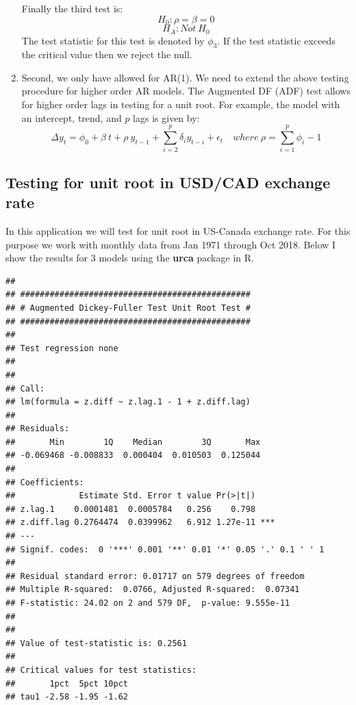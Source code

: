 \documentclass[]{book}
\theoremstyle{definition}
\theoremstyle{definition}
\theoremstyle{definition}
\theoremstyle{remark}
\begin{document}
\begin{enumerate}
  Finally the third test is:
  \[H_0: \rho=\beta=0 \]
  \[H_A: Not \ H_0\]
  The test statistic for this test is denoted by \(\phi_3\). If the test statistic exceeds the critical value then we reject the null.
\item
  Second, we only have allowed for AR(1). We need to extend the above testing procedure for higher order AR models. The Augmented DF (ADF) test allows for higher order lags in testing for a unit root. For example, the model with an intercept, trend, and \(p\) lags is given by:
  \[\Delta y_t= \phi_0 + \beta \ t+ \rho \ y_{t-1}+\sum_{i=2}^p\delta_i  y_{t-i}+\epsilon_t  \quad where \ \rho=\sum_{i=1}^p \phi_i-1\]
\end{enumerate}

\hypertarget{testing-for-unit-root-in-usdcad-exchange-rate}{%
\subsection{Testing for unit root in USD/CAD exchange rate}\label{testing-for-unit-root-in-usdcad-exchange-rate}}

In this application we will test for unit root in US-Canada exchange rate. For this purpose we work with monthly data from Jan 1971 through Oct 2018. Below I show the results for 3 models using the \textbf{urca} package in R.

\begin{verbatim}
## 
## ############################################### 
## # Augmented Dickey-Fuller Test Unit Root Test # 
## ############################################### 
## 
## Test regression none 
## 
## 
## Call:
## lm(formula = z.diff ~ z.lag.1 - 1 + z.diff.lag)
## 
## Residuals:
##       Min        1Q    Median        3Q       Max 
## -0.069468 -0.008833  0.000404  0.010503  0.125044 
## 
## Coefficients:
##             Estimate Std. Error t value Pr(>|t|)    
## z.lag.1    0.0001481  0.0005784   0.256    0.798    
## z.diff.lag 0.2764474  0.0399962   6.912 1.27e-11 ***
## ---
## Signif. codes:  0 '***' 0.001 '**' 0.01 '*' 0.05 '.' 0.1 ' ' 1
## 
## Residual standard error: 0.01717 on 579 degrees of freedom
## Multiple R-squared:  0.0766, Adjusted R-squared:  0.07341 
## F-statistic: 24.02 on 2 and 579 DF,  p-value: 9.555e-11
## 
## 
## Value of test-statistic is: 0.2561 
## 
## Critical values for test statistics: 
##       1pct  5pct 10pct
## tau1 -2.58 -1.95 -1.62
\end{verbatim}
\end{document}
